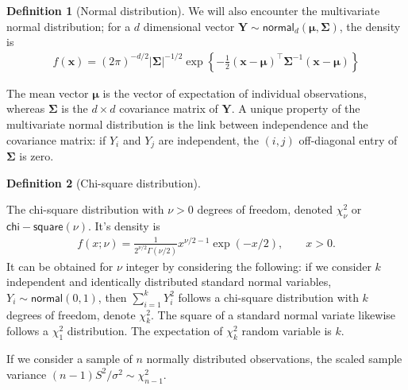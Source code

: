 \documentclass[
  11pt,
  letterpaper,
]{scrbook}
\theoremstyle{definition}
\newtheorem{definition}{Definition}[chapter]
\theoremstyle{definition}
\theoremstyle{plain}
\theoremstyle{remark}
\begin{document}
\begin{definition}[Normal
distribution]
We will also encounter the multivariate normal distribution; for a \(d\)
dimensional vector
\(\boldsymbol{Y} \sim \mathsf{normal}_d(\boldsymbol{\mu}, \boldsymbol{\Sigma})\),
the density is \begin{align*}
f(\boldsymbol{x}) = (2\pi)^{-d/2} |\boldsymbol{\Sigma}|^{-1/2} \exp \left\{ - \frac{1}{2} (\boldsymbol{x}-\boldsymbol{\mu})^\top \boldsymbol{\Sigma}^{-1}(\boldsymbol{x}-\boldsymbol{\mu})\right\}
\end{align*}

The mean vector \(\boldsymbol{\mu}\) is the vector of expectation of
individual observations, whereas \(\boldsymbol{\Sigma}\) is the
\(d \times d\) covariance matrix of \(\boldsymbol{Y}.\) A unique
property of the multivariate normal distribution is the link between
independence and the covariance matrix: if \(Y_i\) and \(Y_j\) are
independent, the \((i,j)\) off-diagonal entry of \(\boldsymbol{\Sigma}\)
is zero.

\end{definition}

\begin{definition}[Chi-square
distribution]\protect\hypertarget{def-chisquare-dist}{}\label{def-chisquare-dist}

The chi-square distribution with \(\nu>0\) degrees of freedom, denoted
\(\chi^2_\nu\) or \(\mathsf{chi-square}(\nu).\) It's density is
\begin{align*}
f(x; \nu) = \frac{1}{2^{\nu/2}\Gamma(\nu/2)}x^{\nu/2-1}\exp(-x/2),\qquad x >0.
\end{align*} It can be obtained for \(\nu\) integer by considering the
following: if we consider \(k\) independent and identically distributed
standard normal variables, \(Y_i \sim \mathsf{normal}(0, 1)\), then
\(\sum_{i=1}^k Y_i^2\) follows a chi-square distribution with \(k\)
degrees of freedom, denote \(\chi^2_k.\) The square of a standard normal
variate likewise follows a \(\chi^2_1\) distribution. The expectation of
\(\chi^2_k\) random variable is \(k.\)

\end{definition}

If we consider a sample of \(n\) normally distributed observations, the
scaled sample variance \((n-1)S^2/\sigma^2 \sim \chi^2_{n-1}.\)
\end{document}
